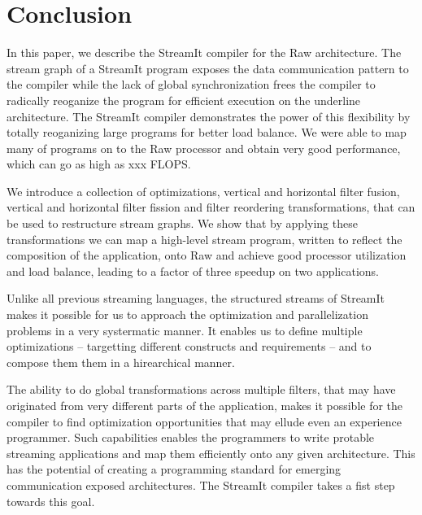 \section{Conclusion}
\label{sec:conclusion}

In this paper, we describe the StreamIt compiler for the Raw
architecture.  The stream graph of a StreamIt program exposes the data
communication pattern to the compiler while the lack of global
synchronization frees the compiler to radically reoganize the program
for efficient execution on the underline architecture. The StreamIt
compiler demonstrates the power of this flexibility by totally
reoganizing large programs for better load balance. We were able to
map many of programs on to the Raw processor and obtain very good
performance, which can go as high as xxx FLOPS.

We introduce a collection of optimizations, vertical and horizontal
filter fusion, vertical and horizontal filter fission and filter
reordering transformations, that can be used to restructure stream
graphs.  We show that by applying these transformations we can map a
high-level stream program, written to reflect the composition of the
application, onto Raw and achieve good processor utilization and load
balance, leading to a factor of three speedup on two applications.

Unlike all previous streaming languages, the structured streams of
StreamIt makes it possible for us to approach the optimization and
parallelization problems in a very systermatic manner. It enables us
to define multiple optimizations -- targetting different constructs
and requirements -- and to compose them them in a hirearchical manner.

The ability to do global transformations across multiple filters, that
may have originated from very different parts of the application,
makes it possible for the compiler to find optimization opportunities
that may ellude even an experience programmer.  Such capabilities
enables the programmers to write protable streaming applications and
map them efficiently onto any given architecture. This has the
potential of creating a programming standard for emerging
communication exposed architectures.  The StreamIt compiler takes a
fist step towards this goal.

